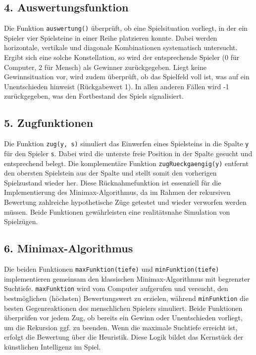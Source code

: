 \subsection*{4. Auswertungsfunktion}

Die Funktion \texttt{auswertung()} überprüft, ob eine Spielsituation vorliegt, in der ein Spieler vier Spielsteine in einer Reihe platzieren konnte. Dabei werden horizontale, vertikale und diagonale Kombinationen systematisch untersucht. Ergibt sich eine solche Konstellation, so wird der entsprechende Spieler (0 für Computer, 2 für Mensch) als Gewinner zurückgegeben. Liegt keine Gewinnsituation vor, wird zudem überprüft, ob das Spielfeld voll ist, was auf ein Unentschieden hinweist (Rückgabewert 1). In allen anderen Fällen wird -1 zurückgegeben, was den Fortbestand des Spiels signalisiert.

\subsection*{5. Zugfunktionen}

Die Funktion \texttt{zug(y, s)} simuliert das Einwerfen eines Spielsteins in die Spalte \texttt{y} für den Spieler \texttt{s}. Dabei wird die unterste freie Position in der Spalte gesucht und entsprechend belegt. Die komplementäre Funktion \texttt{zugRueckgaengig(y)} entfernt den obersten Spielstein aus der Spalte und stellt somit den vorherigen Spielzustand wieder her. Diese Rücknahmefunktion ist essenziell für die Implementierung des Minimax-Algorithmus, da im Rahmen der rekursiven Bewertung zahlreiche hypothetische Züge getestet und wieder verworfen werden müssen. Beide Funktionen gewährleisten eine realitätsnahe Simulation von Spielzügen.

\subsection*{6. Minimax-Algorithmus}

Die beiden Funktionen \texttt{maxFunktion(tiefe)} und \texttt{minFunktion(tiefe)} implementieren gemeinsam den klassischen Minimax-Algorithmus mit begrenzter Suchtiefe. \texttt{maxFunktion} wird vom Computer aufgerufen und versucht, den bestmöglichen (höchsten) Bewertungswert zu erzielen, während \texttt{minFunktion} die besten Gegenreaktionen des menschlichen Spielers simuliert. Beide Funktionen überprüfen vor jedem Zug, ob bereits ein Gewinn oder Unentschieden vorliegt, um die Rekursion ggf. zu beenden. Wenn die maximale Suchtiefe erreicht ist, erfolgt die Bewertung über die Heuristik. Diese Logik bildet das Kernstück der künstlichen Intelligenz im Spiel.

